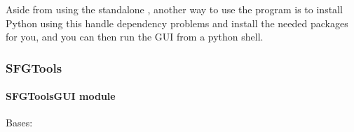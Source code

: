 \documentclass[a4paper,10pt,english]{sphinxmanual}
\begin{document}
\sphinxAtStartPar
Aside from using the standalone , another way to use the program is to install Python using  \sphinxhyphen{} this  handle dependency problems and install the needed packages for you, and you can then run the GUI from a python shell.



\subsubsection{SFGTools}
\label{\detokenize{modules:sfgtools}}\label{\detokenize{modules::doc}}

\paragraph{SFGToolsGUI module}
\label{\detokenize{SFGToolsGUI:module-SFGToolsGUI}}\label{\detokenize{SFGToolsGUI:sfgtoolsgui-module}}\label{\detokenize{SFGToolsGUI::doc}}

\begin{fulllineitems}
\label{\detokenize{SFGToolsGUI:SFGToolsGUI.ItemDelegate}}
\sphinxAtStartPar
Bases: 

\begin{fulllineitems}
\label{\detokenize{SFGToolsGUI:SFGToolsGUI.ItemDelegate.createEditor}}
\end{fulllineitems}


\begin{fulllineitems}
\label{\detokenize{SFGToolsGUI:SFGToolsGUI.ItemDelegate.editingfinished}}
\end{fulllineitems}


\begin{fulllineitems}
\label{\detokenize{SFGToolsGUI:SFGToolsGUI.ItemDelegate.editingstarted}}
\end{fulllineitems}


\end{fulllineitems}
\end{document}
